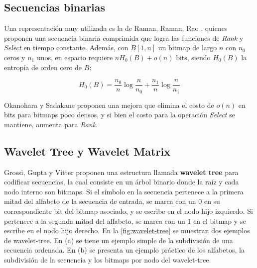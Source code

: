 
\subsection{Secuencias binarias}
Una representación muy utilizada es la de Raman, Raman, Rao \cite{raman2002succinct}, quienes proponen una secuencia binaria comprimida que logra las funciones de \textit{Rank} y \textit{Select} en tiempo constante. Además, con $B[1, n]$ un bitmap de largo $n$ con $n_{0}$ ceros y $n_{1}$ unos, en espacio requiere $nH_{0}(B) + o(n)$ bits, siendo $H_{0}(B)$ la entropía de orden cero de $B$: 

\begin{equation}
	H_{0}(B) = \frac{n_{0}}{n} \log\frac{n}{n_{0}} + \frac{n_{1}}{n} \log\frac{n}{n_{1}}
\end{equation}

Okanohara y Sadakane \cite{DBLP:journals/corr/abs-cs-0610001} proponen una mejora que elimina el costo de $o(n)$ en bits para bitmaps poco densos, y si bien el costo para la operación \textit{Select} se mantiene, aumenta para \textit{Rank}.


\subsection{Wavelet Tree y Wavelet Matrix}
Grossi, Gupta y Vitter \cite{grossi2003high} proponen una estructura llamada \textbf{wavelet tree} para codificar secuencias, la cual consiste en un árbol binario donde la raíz y cada nodo interno son bitmaps. Si el símbolo en la secuencia pertenece a la primera mitad del alfabeto de la secuencia de entrada, se marca con un $0$ en su correspondiente bit del bitmap asociado, y se escribe en el nodo hijo izquierdo. Si pertenece a la segunda mitad del alfabeto, se marca con un $1$ en el bitmap y se escribe en el nodo hijo derecho. En la \autoref{fig:wavelet-tree} se muestran dos ejemplos de wavelet-tree. En (a) se tiene un ejemplo simple de la subdivisión de una secuencia ordenada. En (b) se presenta un ejemplo práctico de los alfabetos, la subdivisión de la secuencia y los bitmaps por nodo del wavelet-tree.

